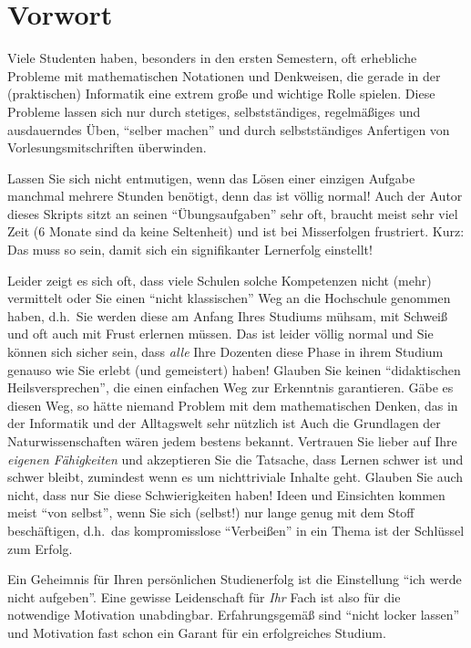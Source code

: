 \section{Vorwort}

Viele Studenten haben, besonders in den ersten Semestern, oft
erhebliche Probleme mit mathematischen Notationen und Denkweisen, die
gerade in der (praktischen) Informatik eine extrem große und wichtige
Rolle spielen. Diese Probleme lassen sich nur durch stetiges,
selbstständiges, regelmäßiges und ausdauerndes Üben, "`selber
machen"' und durch selbstständiges Anfertigen von
Vorlesungsmitschriften überwinden. 

Lassen Sie sich nicht entmutigen, wenn das Lösen einer einzigen
Aufgabe manchmal mehrere Stunden benötigt, denn das ist völlig normal!
Auch der Autor dieses Skripts sitzt an seinen "`Übungsaufgaben"' sehr 
oft, braucht meist sehr viel Zeit (6 Monate sind da keine Seltenheit) und ist
bei Misserfolgen frustriert. Kurz: Das muss so sein, damit sich ein 
signifikanter Lernerfolg einstellt!

Leider zeigt es sich oft, dass viele Schulen solche Kompetenzen nicht
(mehr) vermittelt oder Sie einen "`nicht klassischen"' Weg an die Hochschule genommen 
haben, d.h.~Sie werden diese am Anfang Ihres Studiums
mühsam, mit Schweiß und oft auch mit Frust erlernen müssen. Das ist 
leider völlig normal und Sie können sich sicher sein, dass \emph{alle} Ihre Dozenten
diese Phase in ihrem Studium genauso wie Sie erlebt (und gemeistert) 
haben! Glauben Sie keinen "`didaktischen Heilsversprechen"', die einen einfachen Weg 
zur Erkenntnis garantieren. Gäbe es diesen Weg, so hätte niemand Problem mit dem 
mathematischen Denken, das in der Informatik und der Alltagswelt sehr nützlich ist
Auch die Grundlagen der Naturwissenschaften wären jedem bestens bekannt. Vertrauen Sie
lieber auf Ihre \emph{eigenen Fähigkeiten} und akzeptieren Sie die Tatsache, dass Lernen 
schwer ist  und schwer bleibt,  zumindest wenn es um nichttriviale Inhalte geht. Glauben Sie 
auch nicht,  dass nur Sie  diese Schwierigkeiten haben! Ideen und Einsichten kommen 
meist "`von selbst"', wenn Sie  sich (selbst!)  nur lange  genug mit dem Stoff beschäftigen, d.h.~das kompromisslose "`Verbeißen"' in ein Thema ist der Schlüssel zum Erfolg. 

Ein Geheimnis für Ihren persönlichen Studienerfolg ist die Einstellung "`ich werde nicht
aufgeben"'. Eine gewisse Leidenschaft für \emph{Ihr} Fach ist also für die
notwendige Motivation unabdingbar.  Erfahrungsgemäß sind "`nicht locker lassen"'
und Motivation fast schon ein Garant für ein erfolgreiches Studium.

